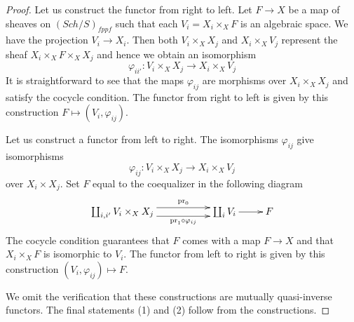 \documentclass[10pt,a4paper]{amsart}
\theoremstyle{plain}
\theoremstyle{definition}
\theoremstyle{remark}
\numberwithin{equation}{subsection}
\def\Sch{\mathit{Sch}}
\begin{document}
\begin{proof}
Let us construct the functor from right to left.
Let $F \to X$ be a map of sheaves on $(\Sch/S)_{fppf}$ such that each
$V_i = X_i \times_X F$ is an algebraic space. We have the
projection $V_i \to X_i$.
Then both $V_i \times_X X_j$ and $X_i \times_X V_j$
represent the sheaf $X_i \times_X F \times_X X_j$
and hence we obtain an isomorphism
$$
\varphi_{ii'} : V_i \times_X X_j \to X_i \times_X V_j
$$
It is straightforward to see that the maps $\varphi_{ij}$
are morphisms over $X_i \times_X X_j$ and satisfy the
cocycle condition. The functor from right to left is given
by this construction $F \mapsto (V_i, \varphi_{ij})$.

\medskip\noindent
Let us construct a functor from left to right.
The isomorphisms $\varphi_{ij}$ give isomorphisms
$$
\varphi_{ij} : V_i \times_X X_j \longrightarrow X_i \times_X V_j
$$
over $X_i \times X_j$. Set $F$ equal to the coequalizer in the
following diagram
$$
\xymatrix{
\coprod_{i, i'} V_i \times_X X_j
\ar@<1ex>[rr]^-{\text{pr}_0}
\ar@<-1ex>[rr]_-{\text{pr}_1 \circ \varphi_{ij}}
& &
\coprod_i V_i \ar[r]
&
F
}
$$
The cocycle condition guarantees that $F$ comes with a map
$F \to X$ and that $X_i \times_X F$ is isomorphic to $V_i$.
The functor from left to right is given
by this construction $(V_i, \varphi_{ij}) \mapsto F$.

\medskip\noindent
We omit the verification that these constructions
are mutually quasi-inverse functors. The final statements
(1) and (2) follow from the constructions.
\end{proof}
\end{document}

